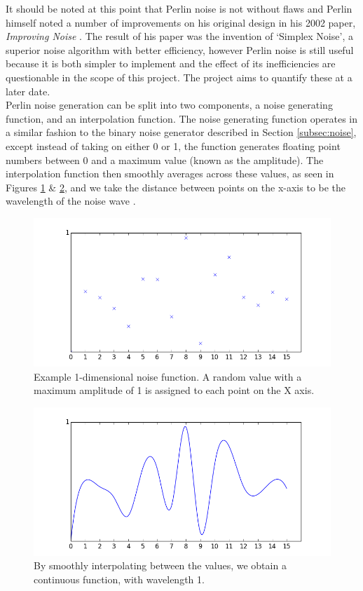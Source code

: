\documentclass[12pt,a4paper]{article}
\begin{document}
It should be noted at this point that Perlin noise is not without flaws and Perlin himself noted a number of improvements on his original design in his 2002 paper, \emph{Improving Noise} \cite{improvepnoise}. The result of his paper was the invention of `Simplex Noise', a superior noise algorithm with better efficiency, however Perlin noise is still useful because it is both simpler to implement and the effect of its inefficiencies are questionable in the scope of this project. The project aims to quantify these at a later date. \\

Perlin noise generation can be split into two components, a noise generating function, and an interpolation function. The noise generating function operates in a similar fashion to the binary noise generator described in Section \ref{subsec:noise}, except instead of taking on either 0 or 1, the function generates floating point numbers between 0 and a maximum value (known as the amplitude). The interpolation function then smoothly averages across these values, as seen in Figures \ref{fig:fig4} \& \ref{fig:fig5}, and we take the distance between points on the x-axis to be the wavelength of the noise wave \cite{Howuseperlin}. 


\begin{figure}[h!]
  \centering
 	\includegraphics[scale=0.5]{images/figure2.png}
	\caption[]{Example 1-dimensional noise function. A random value with a maximum amplitude of 1 is assigned to each point on the X axis.}
	\label{fig:fig4}
\end{figure}

\begin{figure}
  \centering
 	\includegraphics[scale=0.5]{images/figure1.png}
	\caption[]{By smoothly interpolating between the values, we obtain a continuous function, with wavelength 1.}
	\label{fig:fig5}
\end{figure}
\end{document}
